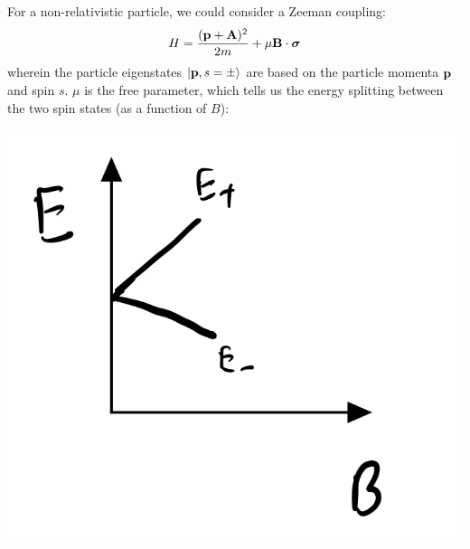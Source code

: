For a non-relativistic particle, we could consider a Zeeman coupling:
\begin{equation}
    H = \frac{(\mathbf{p} + \mathbf{A})^2}{2m} + \mu\mathbf{B} \cdot \mbox{\boldmath$ \sigma $}
\end{equation}
wherein the particle eigenstates $\lvert \mathbf{p}, s = \pm \rangle$ are based on the particle momenta $\mathbf{p}$ and spin $s$. $\mu$ is the free parameter, which tells us the energy splitting between the two spin states (as a function of $B$):

\begin{center}
    \includegraphics[scale=0.35]{Lectures/Images/lec8-energysplit.png}
\end{center}


